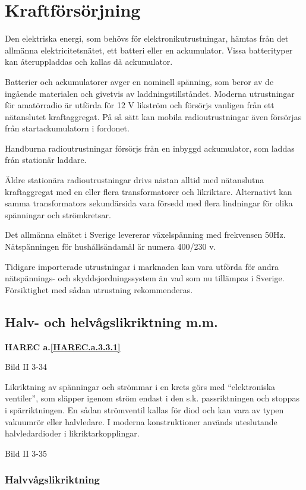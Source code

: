 \section{Kraftförsörjning}

Den elektriska energi, som behövs för elektronikutrustningar, hämtas
från det allmänna elektricitetsnätet, ett batteri eller en
ackumulator. Vissa batterityper kan återuppladdas och kallas då
ackumulator.

Batterier och ackumulatorer avger en nominell spänning, som beror av
de ingående materialen och givetvis av laddningstillståndet. Moderna
utrustningar för amatörradio är utförda för 12 V likström och försörjs
vanligen från ett nätanslutet kraftaggregat. På så sätt kan mobila
radioutrustningar även försörjas från startackumulatorn i fordonet.

Handburna radioutrustningar försörjs från en inbyggd ackumulator, som
laddas från stationär laddare.

Äldre stationära radioutrustningar drivs nästan alltid med nätanslutna
kraftaggregat med en eller flera transformatorer och
likriktare. Alternativt kan samma transformators sekundärsida vara
försedd med flera lindningar för olika spänningar och strömkretsar.

Det allmänna elnätet i Sverige levererar växelspänning med frekvensen
50Hz. Nätspänningen för hushållsändamål är numera 400/230 v.

Tidigare importerade utrustningar i marknaden kan vara utförda för
andra nätspännings- och skyddsjordningssystem än vad som nu tillämpas
i Sverige. Försiktighet med sådan utrustning rekommenderas.

\subsection{Halv- och helvågslikriktning m.m.}
\textbf{HAREC a.\ref{HAREC.a.3.3.1}\label{myHAREC.a.3.3.1}}

Bild II 3-34

Likriktning av spänningar och strömmar i en krets görs med
``elektroniska ventiler'', som släpper igenom ström endast i den
s.k. passriktningen och stoppas i spärriktningen. En sådan strömventil
kallas för diod och kan vara av typen vakuumrör eller halvledare. I
moderna konstruktioner används uteslutande halvledardioder i
likriktarkopplingar.

Bild II 3-35

\subsubsection{Halvvågslikriktning}

